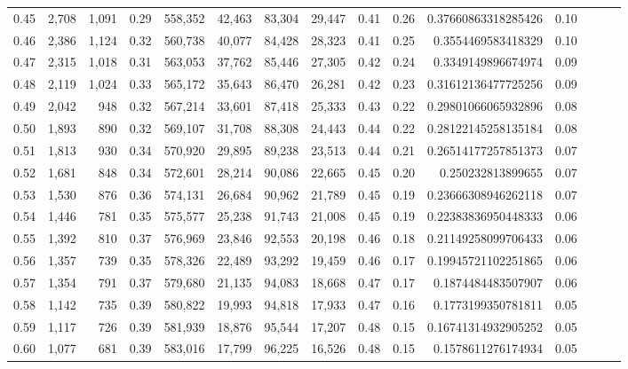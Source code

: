 \begin{tabular}{rrrrrrrrrrrrrrr}
0.45 &   2,708 &  1,091 &  0.29 &  558,352 &   42,463 &   83,304 &   29,447 &  0.41 &  0.26 &   0.37660863318285426 &      0.10 \\
0.46 &   2,386 &  1,124 &  0.32 &  560,738 &   40,077 &   84,428 &   28,323 &  0.41 &  0.25 &    0.3554469583418329 &      0.10 \\
0.47 &   2,315 &  1,018 &  0.31 &  563,053 &   37,762 &   85,446 &   27,305 &  0.42 &  0.24 &    0.3349149896674974 &      0.09 \\
0.48 &   2,119 &  1,024 &  0.33 &  565,172 &   35,643 &   86,470 &   26,281 &  0.42 &  0.23 &   0.31612136477725256 &      0.09 \\
0.49 &   2,042 &    948 &  0.32 &  567,214 &   33,601 &   87,418 &   25,333 &  0.43 &  0.22 &   0.29801066065932896 &      0.08 \\
0.50 &   1,893 &    890 &  0.32 &  569,107 &   31,708 &   88,308 &   24,443 &  0.44 &  0.22 &   0.28122145258135184 &      0.08 \\
0.51 &   1,813 &    930 &  0.34 &  570,920 &   29,895 &   89,238 &   23,513 &  0.44 &  0.21 &   0.26514177257851373 &      0.07 \\
0.52 &   1,681 &    848 &  0.34 &  572,601 &   28,214 &   90,086 &   22,665 &  0.45 &  0.20 &     0.250232813899655 &      0.07 \\
0.53 &   1,530 &    876 &  0.36 &  574,131 &   26,684 &   90,962 &   21,789 &  0.45 &  0.19 &   0.23666308946262118 &      0.07 \\
0.54 &   1,446 &    781 &  0.35 &  575,577 &   25,238 &   91,743 &   21,008 &  0.45 &  0.19 &   0.22383836950448333 &      0.06 \\
0.55 &   1,392 &    810 &  0.37 &  576,969 &   23,846 &   92,553 &   20,198 &  0.46 &  0.18 &   0.21149258099706433 &      0.06 \\
0.56 &   1,357 &    739 &  0.35 &  578,326 &   22,489 &   93,292 &   19,459 &  0.46 &  0.17 &   0.19945721102251865 &      0.06 \\
0.57 &   1,354 &    791 &  0.37 &  579,680 &   21,135 &   94,083 &   18,668 &  0.47 &  0.17 &    0.1874484483507907 &      0.06 \\
0.58 &   1,142 &    735 &  0.39 &  580,822 &   19,993 &   94,818 &   17,933 &  0.47 &  0.16 &    0.1773199350781811 &      0.05 \\
0.59 &   1,117 &    726 &  0.39 &  581,939 &   18,876 &   95,544 &   17,207 &  0.48 &  0.15 &   0.16741314932905252 &      0.05 \\
0.60 &   1,077 &    681 &  0.39 &  583,016 &   17,799 &   96,225 &   16,526 &  0.48 &  0.15 &    0.1578611276174934 &      0.05 \\

\end{tabular}
